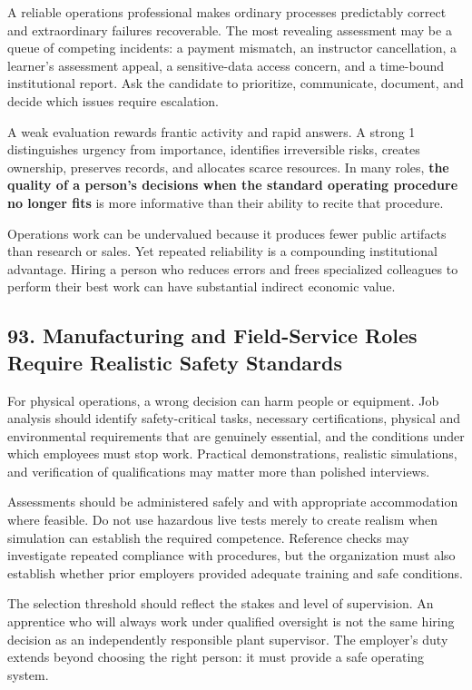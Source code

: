 A reliable operations professional makes ordinary processes predictably correct and extraordinary failures recoverable. The most revealing assessment may be a queue of competing incidents: a payment mismatch, an instructor cancellation, a learner's assessment appeal, a sensitive-data access concern, and a time-bound institutional report. Ask the candidate to prioritize, communicate, document, and decide which issues require escalation.

A weak evaluation rewards frantic activity and rapid answers. A strong 1 distinguishes urgency from importance, identifies irreversible risks, creates ownership, preserves records, and allocates scarce resources. In many roles, \textbf{the quality of a person's decisions when the standard operating procedure no longer fits} is more informative than their ability to recite that procedure.

Operations work can be undervalued because it produces fewer public artifacts than research or sales. Yet repeated reliability is a compounding institutional advantage. Hiring a person who reduces errors and frees specialized colleagues to perform their best work can have substantial indirect economic value.

\subsection*{93. Manufacturing and Field-Service Roles Require Realistic Safety Standards}

For physical operations, a wrong decision can harm people or equipment. Job analysis should identify safety-critical tasks, necessary certifications, physical and environmental requirements that are genuinely essential, and the conditions under which employees must stop work. Practical demonstrations, realistic simulations, and verification of qualifications may matter more than polished interviews.

Assessments should be administered safely and with appropriate accommodation where feasible. Do not use hazardous live tests merely to create realism when simulation can establish the required competence. Reference checks may investigate repeated compliance with procedures, but the organization must also establish whether prior employers provided adequate training and safe conditions.

The selection threshold should reflect the stakes and level of supervision. An apprentice who will always work under qualified oversight is not the same hiring decision as an independently responsible plant supervisor. The employer's duty extends beyond choosing the right person: it must provide a safe operating system.


